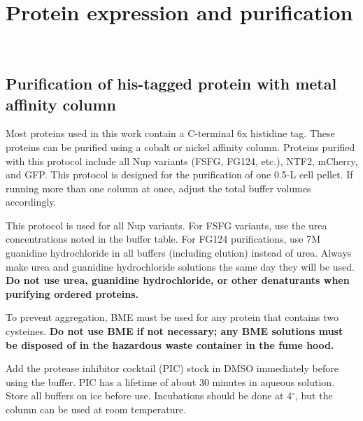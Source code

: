 \chapter{Protein expression and purification}~\label{appx:protein-purification}

\section{Purification of his-tagged protein with metal affinity column}

Most proteins used in this work contain a C-terminal 6x histidine tag.  These proteins can be purified using a cobalt or nickel affinity column.  Proteins purified with this protocol include all Nup variants (FSFG, FG124, etc.), NTF2, mCherry, and GFP.  This protocol is designed for the purification of one 0.5-L cell pellet.  If running more than one column at once, adjust the total buffer volumes accordingly.

This protocol is used for all Nup variants.  For FSFG variants, use the urea concentrations noted in the buffer table.  For FG124 purifications, use 7M guanidine hydrochloride in all buffers (including elution) instead of urea.  Always make urea and guanidine hydrochloride solutions the same day they will be used. \textbf{Do not use urea, guanidine hydrochloride, or other denaturants when purifying ordered proteins.}

To prevent aggregation, BME must be used for any protein that contains two cysteines. \textbf{Do not use BME if not necessary; any BME solutions must be disposed of in the hazardous waste container in the fume hood.}

Add the protease inhibitor cocktail (PIC) stock in DMSO immediately before using the buffer.  PIC has a lifetime of about 30 minutes in aqueous solution.  Store all buffers on ice before use.  Incubations should be done at 4$^\circ$, but the column can be used at room temperature.

